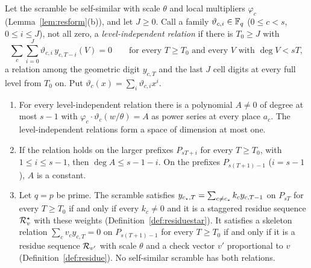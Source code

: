 \begin{proposition}\label{prop:onerel}
Let the scramble be self-similar with scale $\theta$ and local multipliers $\varphi_c$ (Lemma~\ref{lem:resform}(b)), and let $J\ge0$. Call a family $\vartheta_{c,i}\in\mathbb{F}_q$ ($0\le c<s$, $0\le i\le J$), not all zero, a \emph{level-independent relation} if there is $T_0\ge J$ with
\[
\sum_c\sum_{i=0}^{J}\vartheta_{c,i}\,y_{c,T-i}(V)=0\qquad\text{for every }T\ge T_0\text{ and every }V\text{ with }\deg V<sT,
\]
a relation among the geometric digit $y_{c,T}$ and the last $J$ cell digits at every full level from $T_0$ on. Put $\vartheta_c(x)=\sum_i\vartheta_{c,i}x^i$.
\begin{enumerate}
\item[(i)] For every level-independent relation there is a polynomial $A\ne0$ of degree at most $s-1$ with $\varphi_c\cdot\vartheta_c(w/\theta)=A$ as power series at every place $a_c$. The level-independent relations form a space of dimension at most one.
\item[(ii)] If the relation holds on the larger prefixes $P_{sT+i}$ for every $T\ge T_0$, with $1\le i\le s-1$, then $\deg A\le s-1-i$. On the prefixes $P_{s(T+1)-1}$ ($i=s-1$), $A$ is a constant.
\item[(iii)] Let $q=p$ be prime. The scramble satisfies $y_{c_{\star},T}=\sum_{c\ne c_{\star}}k_cy_{c,T-1}$ on $P_{sT}$ for every $T\ge T_0$ if and only if every $k_c\ne0$ and it is a staggered residue sequence $\mathcal{R}^{\star}_v$ with these weights (Definition~\ref{def:residuestar}). It satisfies a skeleton relation $\sum_cv_cy_{c,T}=0$ on $P_{s(T+1)-1}$ for every $T\ge T_0$ if and only if it is a residue sequence $\mathcal{R}_{v'}$ with scale $\theta$ and a check vector $v'$ proportional to $v$ (Definition~\ref{def:residue}). No self-similar scramble has both relations.
\end{enumerate}
\end{proposition}

